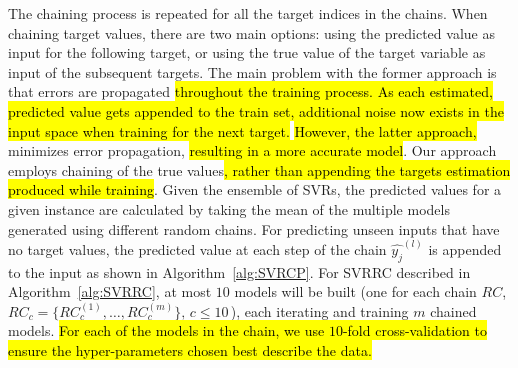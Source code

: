 \documentclass[preprint,12pt]{elsarticle}
\begin{document}
The chaining process is repeated for all the target indices in the chains. When chaining target values, there are two main options: using the predicted value as input for the following target, or using the true value of the target variable as input of the subsequent targets. The main problem with the former approach is that errors are propagated \hl{throughout the training process. As each estimated, predicted value gets appended to the train set, additional noise now exists in the input space when training for the next target.} \hl{However, the latter approach,} minimizes error propagation,  \hl{resulting in a more accurate model}. Our approach  employs chaining of the true values\hl{, rather than appending the targets estimation produced while training}. Given the ensemble of SVRs, the predicted values for a given instance are calculated by taking the mean of the multiple models generated using different random chains. For predicting unseen inputs that have no target values, the predicted value at each step of the chain $\hat{y_j}^{(l)}$ is appended to the input as shown in Algorithm~\ref{alg:SVRCP}. For SVRRC described in Algorithm~\ref{alg:SVRRC}, at most $10$ models will be built (one for each chain $RC$, $RC_c = \{RC_c^{(1)}, \ldots, RC_c^{(m)}\}, \, c \leq 10 \,$), each iterating and training $m$ chained models. \hl{For each of the models in the chain, we use $10$-fold cross-validation to ensure the hyper-parameters chosen best describe the data.}

\end{document}
